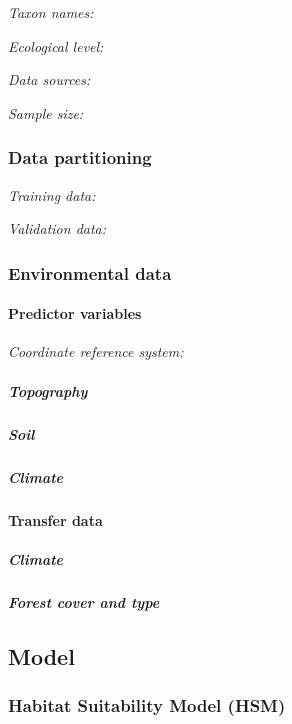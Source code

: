 \documentclass[11pt, a4paper]{article}
\begin{document}
\emph{Taxon names:}

\emph{Ecological level:}

\emph{Data sources:}

\emph{Sample size:}

\hypertarget{data-partitioning}{%
\subsubsection{Data partitioning}\label{data-partitioning}}

\emph{Training data:}

\emph{Validation data:}

\hypertarget{environmental-data}{%
\subsubsection{Environmental data}\label{environmental-data}}

\hypertarget{predictor-variables}{%
\paragraph{Predictor variables}\label{predictor-variables}}

\emph{Coordinate reference system:}

\hypertarget{topography}{%
\subparagraph{Topography}\label{topography}}

\hypertarget{soil}{%
\subparagraph{Soil}\label{soil}}

\hypertarget{climate}{%
\subparagraph{Climate}\label{climate}}

\hypertarget{transfer-data}{%
\paragraph{Transfer data}\label{transfer-data}}

\hypertarget{climate-1}{%
\subparagraph{Climate}\label{climate-1}}

\hypertarget{forest-cover-and-type}{%
\subparagraph{Forest cover and type}\label{forest-cover-and-type}}

\hypertarget{model}{%
\subsection{Model}\label{model}}

\hypertarget{habitat-suitability-model-hsm}{%
\subsubsection{Habitat Suitability Model
(HSM)}\label{habitat-suitability-model-hsm}}
\end{document}
